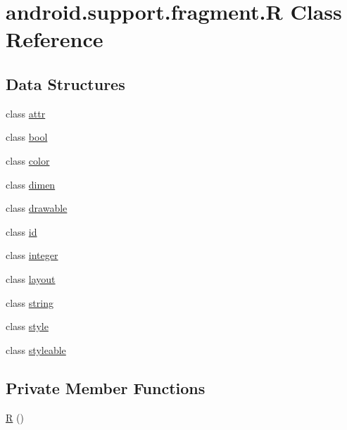 \hypertarget{classandroid_1_1support_1_1fragment_1_1_r}{}\section{android.\+support.\+fragment.\+R Class Reference}
\label{classandroid_1_1support_1_1fragment_1_1_r}
\subsection*{Data Structures}
\begin{DoxyCompactItemize}
\item 
class \mbox{\hyperlink{classandroid_1_1support_1_1fragment_1_1_r_1_1attr}{attr}}
\item 
class \mbox{\hyperlink{classandroid_1_1support_1_1fragment_1_1_r_1_1bool}{bool}}
\item 
class \mbox{\hyperlink{classandroid_1_1support_1_1fragment_1_1_r_1_1color}{color}}
\item 
class \mbox{\hyperlink{classandroid_1_1support_1_1fragment_1_1_r_1_1dimen}{dimen}}
\item 
class \mbox{\hyperlink{classandroid_1_1support_1_1fragment_1_1_r_1_1drawable}{drawable}}
\item 
class \mbox{\hyperlink{classandroid_1_1support_1_1fragment_1_1_r_1_1id}{id}}
\item 
class \mbox{\hyperlink{classandroid_1_1support_1_1fragment_1_1_r_1_1integer}{integer}}
\item 
class \mbox{\hyperlink{classandroid_1_1support_1_1fragment_1_1_r_1_1layout}{layout}}
\item 
class \mbox{\hyperlink{classandroid_1_1support_1_1fragment_1_1_r_1_1string}{string}}
\item 
class \mbox{\hyperlink{classandroid_1_1support_1_1fragment_1_1_r_1_1style}{style}}
\item 
class \mbox{\hyperlink{classandroid_1_1support_1_1fragment_1_1_r_1_1styleable}{styleable}}
\end{DoxyCompactItemize}
\subsection*{Private Member Functions}
\begin{DoxyCompactItemize}
\item 
\mbox{\hyperlink{classandroid_1_1support_1_1fragment_1_1_r_ac2098583343558d9dd2ab4c9147159d9}{R}} ()
\end{DoxyCompactItemize}


